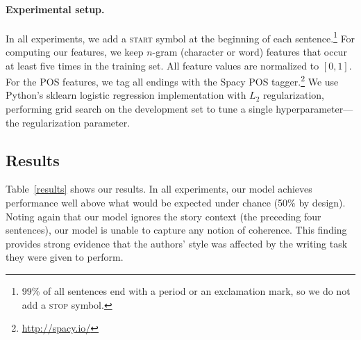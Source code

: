 \documentclass[11pt,a4paper]{article}
\newcommand{\tabref}[1]{Table~\ref{#1}}
\newcommand{\isubsectionb}[1]{\subsection{#1}\label{ssec:#1}}
\newcommand{\com}[1]{}
\newcommand{\resolved}[1]{}
\newcommand{\yc}[1]{{\color{bblue}\{\textit{#1}\}$_{yc}$}}
\newcommand{\nascomment}[1]{{\color{blue}\textsc{[#1 --nas]}}}
\newcommand{\clinic}[1]{{\color{magenta}\textsc{[#1 --CLINIC]}}}
\renewcommand{\nascomment}[1]{}
\renewcommand{\yc}[1]{}
\begin{document}
\paragraph{Experimental setup.}
In all experiments, we add a \textsc{start} symbol at the beginning
of each sentence.\footnote{99\% of all sentences end with a period
  or an exclamation mark, so we do not add a \textsc{stop} symbol.}
For computing our features, we keep $n$-gram (character or word) features that occur at least five times in the training set.
All feature values are normalized to $[0, 1]$.
For the POS features, we tag all endings with the Spacy POS tagger.\footnote{\url{http://spacy.io/}}
We use  Python's sklearn logistic regression implementation \cite{scikit-learn} with $L_2$
regularization, performing grid search on the development set to
tune a single hyperparameter---the regularization parameter.   \resolved{\nascomment{any other hyperparameters?  if
  not, say this is the only one.  else explain what they are.}}


\isubsectionb{Results}
\tabref{results} shows our results.  In all experiments,
our model achieves performance well above what would be expected under
chance (50\% by design).  Noting again that our model ignores the
story context (the preceding four sentences), our model is unable to
capture any notion of coherence.   This finding provides
strong evidence that the authors' style was affected by the writing task they
were given to perform.\com{ On our third task, which compared 
\emph{original} vs.~\emph{wrong (new)} endings, even stronger
differences were apparent to the model, allowing over 75\% accuracy.}


\resolved{\nascomment{I rewrote this section.  old version commented out in
  latex source}}
\end{document}
